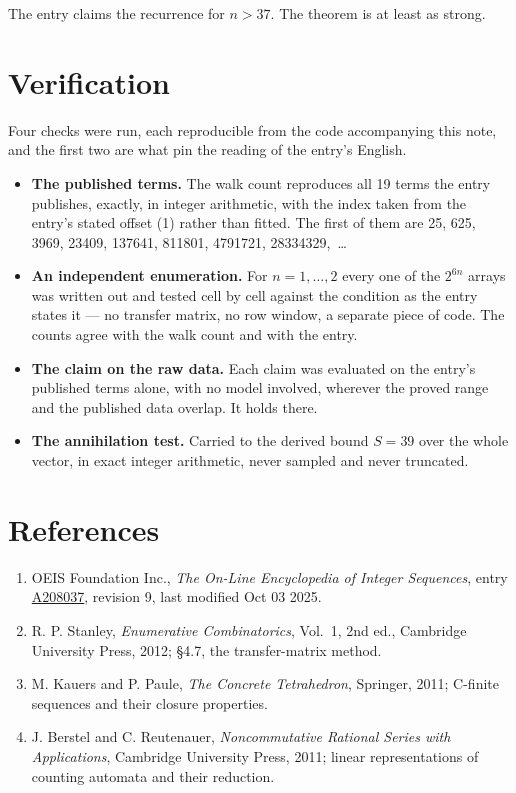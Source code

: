 \documentclass[11pt]{article}
\theoremstyle{definition}
\begin{document}
The entry claims the recurrence for $n > 37$. The theorem is at least as strong.

\section{Verification}

Four checks were run, each reproducible from the code accompanying this note, and the first two are what pin the reading of the entry's English.

\begin{itemize}

\item {\bfseries The published terms.} The walk count reproduces all 19 terms the entry publishes, exactly, in integer arithmetic, with the index taken from the entry's stated offset (1) rather than fitted. The first of them are 25, 625, 3969, 23409, 137641, 811801, 4791721, 28334329,~\dots

\item {\bfseries An independent enumeration.} For $n = 1,\dots,2$ every one of the $2^{6n}$ arrays was written out and tested cell by cell against the condition as the entry states it --- no transfer matrix, no row window, a separate piece of code. The counts agree with the walk count and with the entry.

\item {\bfseries The claim on the raw data.} Each claim was evaluated on the entry's published terms alone, with no model involved, wherever the proved range and the published data overlap. It holds there.

\item {\bfseries The annihilation test.} Carried to the derived bound $S = 39$ over the whole vector, in exact integer arithmetic, never sampled and never truncated.

\end{itemize}

\section{References}

\begin{enumerate}

\item OEIS Foundation Inc., \emph{The On-Line Encyclopedia of Integer Sequences}, entry \href{https://oeis.org/A208037}{A208037}, revision 9, last modified Oct 03 2025.

\item R. P. Stanley, \emph{Enumerative Combinatorics}, Vol.~1, 2nd ed., Cambridge University Press, 2012; \S4.7, the transfer-matrix method.

\item M. Kauers and P. Paule, \emph{The Concrete Tetrahedron}, Springer, 2011; C-finite sequences and their closure properties.

\item J. Berstel and C. Reutenauer, \emph{Noncommutative Rational Series with Applications}, Cambridge University Press, 2011; linear representations of counting automata and their reduction.

\end{enumerate}
\end{document}
